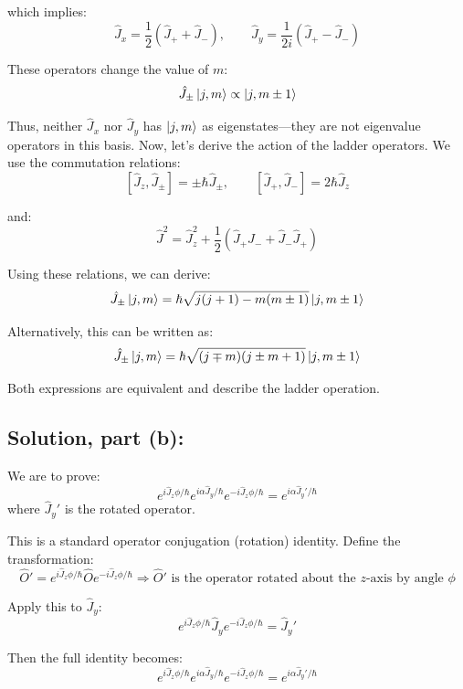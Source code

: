 \documentclass[12pt]{article}
\begin{document}
        which implies:
        \[
            \hat{J}_x = \frac{1}{2}(\hat{J}_+ + \hat{J}_-), \qquad \hat{J}_y = \frac{1}{2i}(\hat{J}_+ - \hat{J}_-)
        \]
        
        These operators change the value of \( m \):
        \[
            \hat{J}_\pm \ket{j, m} \propto \ket{j, m \pm 1}
        \]
        
        Thus, neither \( \hat{J}_x \) nor \( \hat{J}_y \) has \( \ket{j, m} \) as eigenstates—they are not eigenvalue operators in this basis. Now, let’s derive the action of the ladder operators. We use the commutation relations:
        \[
            [\hat{J}_z, \hat{J}_\pm] = \pm \hbar \hat{J}_\pm, \qquad [\hat{J}_+, \hat{J}_-] = 2\hbar \hat{J}_z
        \]
        
        and:
        \[
            \hat{J}^2 = \hat{J}_z^2 + \frac{1}{2}(\hat{J}_+ \hat{J}_- + \hat{J}_- \hat{J}_+)
        \]
        
        Using these relations, we can derive:
        \[
            \hat{J}_\pm \ket{j, m} = \hbar \sqrt{j(j+1) - m(m \pm 1)} \ket{j, m \pm 1}
        \]
        
        Alternatively, this can be written as:
        \[
            \hat{J}_\pm \ket{j, m} = \hbar \sqrt{(j \mp m)(j \pm m + 1)} \ket{j, m \pm 1}
        \]
        
        Both expressions are equivalent and describe the ladder operation.

    \subsection{Solution, part (b):}
        We are to prove:
        \[
            e^{i \hat{J}_z \phi / \hbar} e^{i \alpha \hat{J}_y / \hbar} e^{-i \hat{J}_z \phi / \hbar} = e^{i \alpha \hat{J}_y' / \hbar}
        \]
        where \( \hat{J}_y' \) is the rotated operator.
        
        This is a standard operator conjugation (rotation) identity. Define the transformation:
        \[
            \hat{O}' = e^{i \hat{J}_z \phi / \hbar} \hat{O} e^{-i \hat{J}_z \phi / \hbar}
            \Rightarrow \hat{O}' \text{ is the operator rotated about the } z\text{-axis by angle } \phi
        \]
        
        Apply this to \( \hat{J}_y \):
        \[
            e^{i \hat{J}_z \phi / \hbar} \hat{J}_y e^{-i \hat{J}_z \phi / \hbar} = \hat{J}_y'
        \]
        
        Then the full identity becomes:
        \[
            e^{i \hat{J}_z \phi / \hbar} e^{i \alpha \hat{J}_y / \hbar} e^{-i \hat{J}_z \phi / \hbar} 
            = e^{i \alpha \hat{J}_y' / \hbar}
        \]
        
\end{document}
